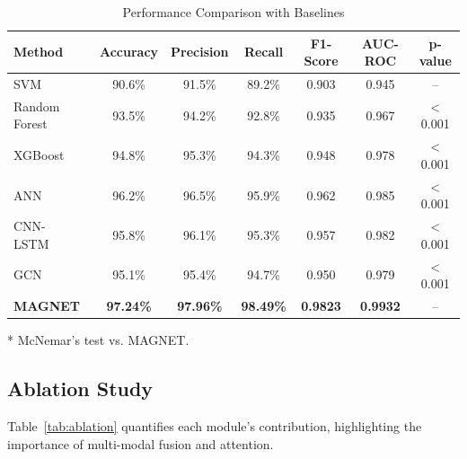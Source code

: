 \documentclass[10pt,conference]{IEEEtran}
\begin{document}
\begin{table}[!t]
    \centering
    \caption{Performance Comparison with Baselines}
    \label{tab:baseline_comparison}
    \begin{threeparttable}
        \begin{tabular}{lcccccc}
            \toprule
            \textbf{Method} & \textbf{Accuracy} & \textbf{Precision} & \textbf{Recall} & \textbf{F1-Score} & \textbf{AUC-ROC} & \textbf{p-value\tnote{*}} \\
            \midrule
            SVM~\cite{DrebinPaper} & 90.6\% & 91.5\% & 89.2\% & 0.903 & 0.945 & -- \\
            Random Forest~\cite{AndroidMalwareSurvey} & 93.5\% & 94.2\% & 92.8\% & 0.935 & 0.967 & < 0.001 \\
            XGBoost~\cite{AndroidMalwareSurvey} & 94.8\% & 95.3\% & 94.3\% & 0.948 & 0.978 & < 0.001 \\
            ANN~\cite{DeepLearningMalware} & 96.2\% & 96.5\% & 95.9\% & 0.962 & 0.985 & < 0.001 \\
            CNN-LSTM~\cite{Vinayakumar2019} & 95.8\% & 96.1\% & 95.3\% & 0.957 & 0.982 & < 0.001 \\
            GCN~\cite{Kipf2017} & 95.1\% & 95.4\% & 94.7\% & 0.950 & 0.979 & < 0.001 \\
            \textbf{MAGNET} & \textbf{97.24\%} & \textbf{97.96\%} & \textbf{98.49\%} & \textbf{0.9823} & \textbf{0.9932} & -- \\
            \bottomrule
        \end{tabular}
        \begin{tablenotes}
            \small
            \item[*] McNemar's test vs. MAGNET.
        \end{tablenotes}
    \end{threeparttable}
\end{table}

\subsection{Ablation Study}
Table~\ref{tab:ablation} quantifies each module’s contribution, highlighting the importance of multi-modal fusion and attention.
\end{document}
